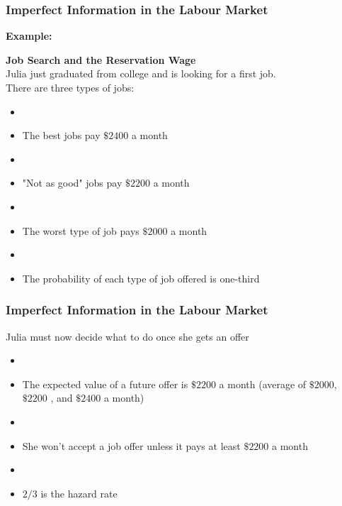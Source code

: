 \documentclass[blue]{beamer}
\begin{document}
 \begin{frame} \frametitle{Imperfect Information in the Labour Market}
\label{imperfect info and labour market}

\textbf{Example:}

\textbf{Job Search and the Reservation Wage}\\

Julia just graduated from college and is looking for a first job.\\

There are three types of jobs: \\
\begin{itemize}
\item[]
\item The best jobs pay $\$ 2400$ a month
\item[]
\item "Not as good" jobs pay $\$ 2200$ a month
\item[]
\item The worst type of job pays $\$ 2000$ a month
\item[]
\item The probability of each type of job offered is one-third

\end{itemize}
 \end{frame}


 \begin{frame} \frametitle{Imperfect Information in the Labour Market}
\label{imperfect info and labour market}

Julia must now decide what to do once she gets an offer
\begin{itemize}
\item[]
\item The expected value of a future offer is $\$ 2200$ a month (average of $\$ 2000$,  $\$ 2200$ , and $\$ 2400$ a month)
\item[]
\item She won't accept a job offer unless it pays at least $\$ 2200$ a month
\item[]
\item $2/3$ is the hazard rate
\end{itemize}
 \end{frame}
\end{document}

